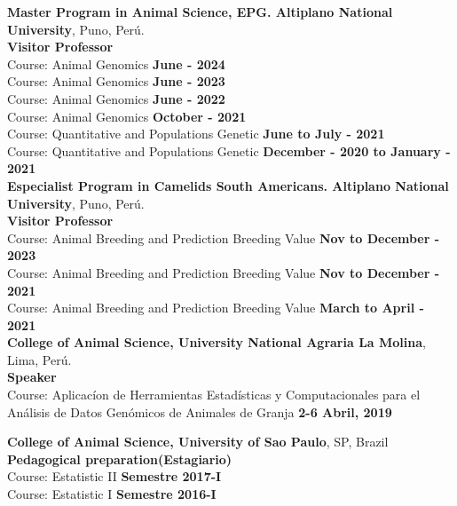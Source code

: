 \documentclass[margin,line,10pt]{res}
\begin{document}
\begin{resume}
{\bf Master Program in Animal Science, EPG. Altiplano National University}, Puno, Perú.\\
\textbf{Visitor Professor} \\

Course: Animal Genomics  \hfill {\bf June - 2024}\\
Course: Animal Genomics  \hfill {\bf June - 2023}\\
Course: Animal Genomics  \hfill {\bf June - 2022}\\
Course: Animal Genomics  \hfill {\bf October - 2021}\\
Course: Quantitative and Populations Genetic   \hfill {\bf June  to July - 2021}\\
Course: Quantitative and Populations Genetic  \hfill {\bf December - 2020 to January - 2021}\\


{\bf Especialist Program in Camelids South Americans. Altiplano National University}, Puno, Perú.\\
\textbf{Visitor Professor} \\

Course: Animal Breeding and Prediction Breeding Value    \hfill {\bf Nov to December - 2023}\\
Course: Animal Breeding and Prediction Breeding Value    \hfill {\bf Nov to December - 2021}\\
Course: Animal Breeding and Prediction Breeding Value     \hfill {\bf March to April - 2021 }\\


{\bf College of Animal Science, University National Agraria La Molina}, Lima, Perú.\\
\textbf{Speaker} \\
Course: Aplicacíon de Herramientas Estadísticas y Computacionales para el Análisis de Datos Genómicos de Animales de Granja    \hfill {\bf 2-6 Abril, 2019}\\
\vspace{0.5cm}

{\bf College of Animal Science, University of Sao Paulo}, SP, Brazil\\
\textbf{Pedagogical preparation(Estagiario)} \\
Course: Estatistic II     \hfill {\bf Semestre 2017-I}\\
Course: Estatistic I      \hfill {\bf Semestre 2016-I}\\
\vspace{0.5cm}


\end{resume}
\end{document}
